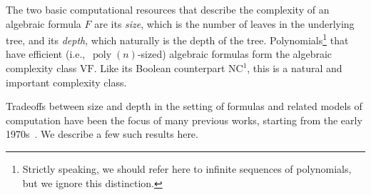 \documentclass[11pt,a4paper]{article}
\newcommand{\poly}{\mathop{\mathrm{poly}}}
\begin{document}
The two basic computational resources that describe the complexity of an algebraic formula $F$ are its \emph{size}, which is the number of leaves in the underlying tree, and its \emph{depth}, which naturally is the depth of the tree. Polynomials\footnote{Strictly speaking, we should refer here to infinite sequences of polynomials, but we ignore this distinction.} that have efficient (i.e.,~$\poly(n)$-sized) algebraic formulas form the algebraic complexity class $\mathrm{VF}.$ Like its Boolean counterpart $\mathrm{NC}^1$, this is a natural and important complexity class. 

Tradeoffs between size and depth in the setting of formulas and related models of computation have been the focus of many previous works, starting from the early 1970s~\cite{Spira71tradeoffs,BKM, Brent, VSBR, ShamirSnir, Nisan, Raznc2nc1, RYbalance, AV, Koiran, Tav13, GKKSdepth3, KSS, CKSV, LST-ECCC}. We describe a few such results here.
\end{document}
